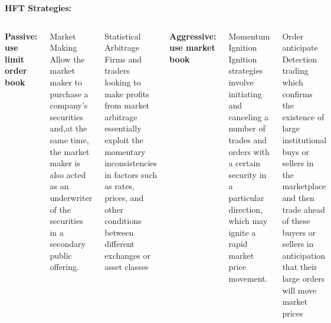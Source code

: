 \documentclass[xcolor={x11names,svgnames,dvipsnames}]{beamer}
\begin{document}
\begin{frame}

\textbf{\large{HFT Strategies:}}

\begin{columns}
\column{2.4in}
\textbf{Passive: use limit order book}
\begin{block}{Market Making}
\small{Allow the market maker to purchase a company’s securities and,at the same time, the market maker
is also acted as an underwriter of the securities in a secondary public offering. }
\end{block}
\begin{block}{\alert{Statistical Arbitrage}}
\small{Firms and traders looking to make profits from market arbitrage essentially exploit
 the momentary \alert{inconsistencies} in factors such as rates, prices, and other conditions
 between different exchanges or asset classes}
\end{block}
\column{2.5in}
\textbf{Aggressive: use market book}
\begin{block}{Momentum Ignition }
\small{Ignition strategies involve initiating and canceling a number of trades and orders with a certain security in a particular direction, which may ignite a rapid market price movement.}
\end{block}
\begin{block}{ Order anticipate}
\small{Detection trading which confirms
the existence of large institutional buys or sellers in the marketplace and then trade ahead of these
buyers or sellers in anticipation that their large orders will move market prices}
\end{block}

\end{columns}
\end{frame}
\end{document}
